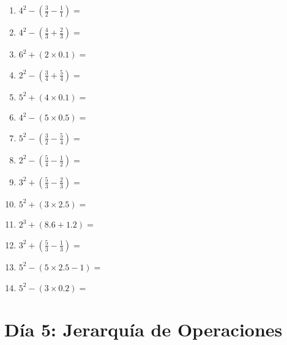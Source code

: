 \documentclass[12pt]{article}
\begin{document}
\begin{enumerate}
\item \large $ 4^{2} - (\frac{3}{2} - \frac{1}{1}) = $ \vspace{1.4cm}
\item \large $ 4^{2} - (\frac{4}{3} + \frac{2}{3}) = $ \vspace{1.4cm}
\newpage
\item \large $ 6^{2} + (2 \times 0.1) = $ \vspace{1.4cm}
\item \large $ 2^{2} - (\frac{3}{4} + \frac{5}{4}) = $ \vspace{1.4cm}
\item \large $ 5^{2} + (4 \times 0.1) = $ \vspace{1.4cm}
\item \large $ 4^{2} - (5 \times 0.5) = $ \vspace{1.4cm}
\item \large $ 5^{2} - (\frac{3}{2} - \frac{5}{4}) = $ \vspace{1.4cm}
\item \large $ 2^{2} - (\frac{5}{4} - \frac{1}{2}) = $ \vspace{1.4cm}
\item \large $ 3^{2} + (\frac{5}{3} - \frac{2}{3}) = $ \vspace{1.4cm}
\item \large $ 5^{2} + (3 \times 2.5) = $ \vspace{1.4cm}
\item \large $ 2^{3} + (8.6 + 1.2) = $ \vspace{1.4cm}
\item \large $ 3^{2} + (\frac{5}{3} - \frac{1}{3}) = $ \vspace{1.4cm}
\newpage
\item \large $ 5^{2} - (5 \times 2.5 - 1) = $ \vspace{1.4cm}
\item \large $ 5^{2} - (3 \times 0.2) = $ \vspace{1.4cm}
\end{enumerate}
\newpage
\section*{Día 5: Jerarquía de Operaciones}
\end{document}
